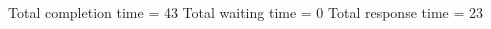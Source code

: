 \begin{RTGrid}[width=0.8\textwidth]{5}{20}
\end{RTGrid}\newline\newline
Total completion time = 43\newline
Total waiting time = 0\newline
Total response time = 23\newline
